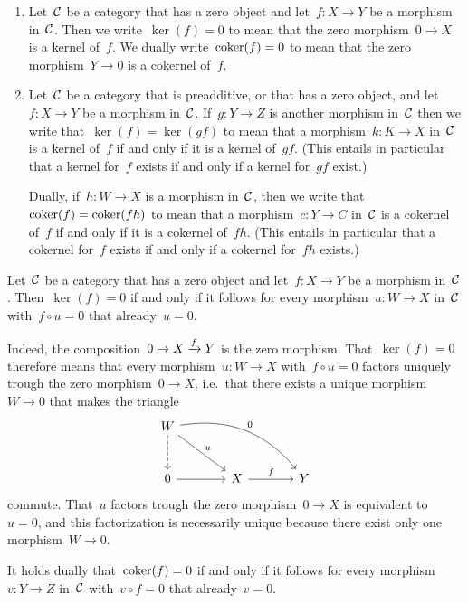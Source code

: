 









\begin{notation*}
  \label{equality of (co)kernels}
  \leavevmode
  \begin{enumerate}
    \item
      Let~$\mathcal{C}$ be a category that has a zero object and let~$f \colon X \to Y$ be a morphism in~$\mathcal{C}$.
      Then we write~$\ker(f) = 0$ to mean that the zero morphism~$0 \to X$ is a kernel of~$f$.
      We dually write~$\operatorname{coker}(f) = 0$ to mean that the zero morphism~$Y \to 0$ is a cokernel of~$f$.
    \item
      Let~$\mathcal{C}$ be a category that is preadditive, or that has a zero object, and let~$f \colon X \to Y$ be a morphism in~$\mathcal{C}$.
      If~$g \colon Y \to Z$ is another morphism in~$\mathcal{C}$ then we write that~$\ker(f) = \ker(gf)$ to mean that a morphism~$k \colon K \to X$ in~$\mathcal{C}$ is a kernel of~$f$ if and only if it is a kernel of~$gf$.
      (This entails in particular that a kernel for~$f$ exists if and only if a kernel for~$gf$ exist.)
      
      Dually, if~$h \colon W \to X$ is a morphism in~$\mathcal{C}$, then we write that~$\operatorname{coker}(f) = \operatorname{coker}(fh)$ to mean that a morphism~$c \colon Y \to C$ in~$\mathcal{C}$ is a cokernel of~$f$ if and only if it is a cokernel of~$fh$.
      (This entails in particular that a cokernel for~$f$ exists if and only if a cokernel for~$fh$ exists.)
  \end{enumerate}
\end{notation*}


\begin{remark*}
  Let~$\mathcal{C}$ be a category that has a zero object and let~$f \colon X \to Y$ be a morphism in~$\mathcal{C}$.
  Then~$\ker(f) = 0$ if and only if it follows for every morphism~$u \colon W \to X$ in~$\mathcal{C}$ with~$f \circ u = 0$ that already~$u = 0$.
  
  Indeed, the composition~$0 \to X \xrightarrow{f} Y$ is the zero morphism.
  That~$\ker(f) = 0$ therefore means that every morphism~$u \colon W \to X$ with~$f \circ u = 0$ factors uniquely trough the zero morphism~$0 \to X$, i.e.\ that there exists a unique morphism~$W \to 0$ that makes the triangle
  \[
    \begin{tikzcd}[sep = large]
        W
        \arrow[dashed]{d}
        \arrow{dr}[above right]{u}
        \arrow[bend left]{drr}[above right]{0}
      & {}
      & {}
      \\
        0
        \arrow{r}
      & X
        \arrow{r}[above]{f}
      & Y
    \end{tikzcd}
  \]
  commute.
  That~$u$ factors trough the zero morphism~$0 \to X$ is equivalent to~$u = 0$, and this factorization is necessarily unique because there exist only one morphism~$W \to 0$.
  
  It holds dually that~$\operatorname{coker}(f) = 0$ if and only if it follows for every morphism~$v \colon Y \to Z$ in~$\mathcal{C}$ with~$v \circ f = 0$ that already~$v = 0$.
\end{remark*}


